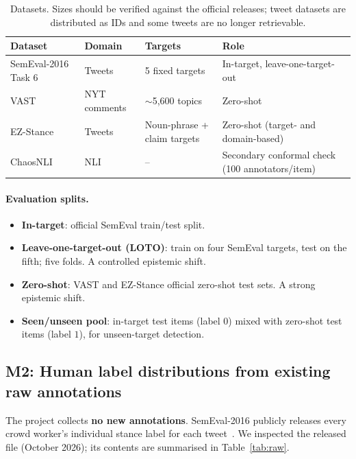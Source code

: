 \documentclass[11pt,a4paper]{article}
\begin{document}
\begin{table}[ht]
\centering
\small
\begin{tabular}{l l p{3.4cm} p{4.4cm}}
\toprule
Dataset & Domain & Targets & Role \\
\midrule
SemEval-2016 Task 6~\cite{mohammad2016} & Tweets & 5 fixed targets & In-target, leave-one-target-out \\
VAST~\cite{allaway2020} & NYT comments & $\sim$5{,}600 topics & Zero-shot \\
EZ-Stance~\cite{zhao2024} & Tweets & Noun-phrase + claim targets & Zero-shot (target- and domain-based) \\
ChaosNLI~\cite{nie2020} & NLI & -- & Secondary conformal check (100 annotators/item) \\
\bottomrule
\end{tabular}
\caption{Datasets. Sizes should be verified against the official releases; tweet
datasets are distributed as IDs and some tweets are no longer retrievable.}
\label{tab:data}
\end{table}

\paragraph{Evaluation splits.}
\begin{itemize}[leftmargin=*]
  \item \textbf{In-target}: official SemEval train/test split.
  \item \textbf{Leave-one-target-out (LOTO)}: train on four SemEval targets, test on the
  fifth; five folds. A controlled epistemic shift.
  \item \textbf{Zero-shot}: VAST and EZ-Stance official zero-shot test sets. A strong
  epistemic shift.
  \item \textbf{Seen/unseen pool}: in-target test items (label $0$) mixed with zero-shot test
  items (label $1$), for unseen-target detection.
\end{itemize}

\subsection{M2: Human label distributions from existing raw annotations}\label{sec:m2}

The project collects \textbf{no new annotations}. SemEval-2016 publicly releases every
crowd worker's individual stance label for each tweet~\cite{mohammad2016,mohammad2017}. We
inspected the released file (October 2026); its contents are summarised in
Table~\ref{tab:raw}.
\end{document}

